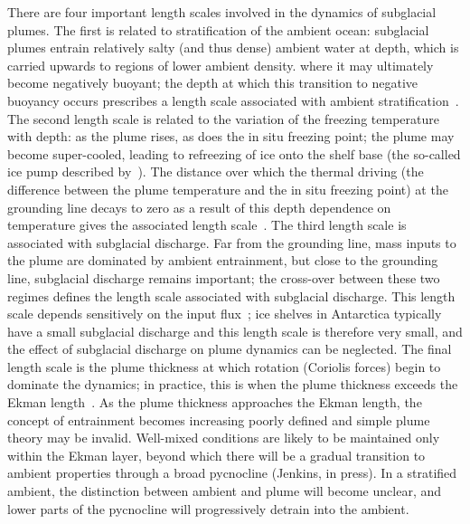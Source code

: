 \documentclass[openacc]{rsproca_new}%
\begin{document}
There are four important length scales involved in the dynamics of subglacial plumes. The first is related to stratification of the ambient ocean: subglacial plumes entrain relatively salty (and thus dense) ambient water at depth, which is carried upwards to regions of lower ambient density.  where it may ultimately become negatively buoyant; the depth at which this transition to negative buoyancy occurs prescribes a length scale associated with ambient stratification~\citep{Magorrian2016JGeoResOcean}. The second length scale is related to the variation of the freezing temperature with depth: as the plume rises, as does the in situ freezing point; the plume may become super-cooled, leading to refreezing of ice onto the shelf base (the so-called ice pump described by~\cite{Lewis1986JGeophysResOceans}). The distance over which the thermal driving (the difference between the plume temperature and the in situ freezing point) at the grounding line decays to zero as a result of this depth dependence on temperature gives the associated length scale~\citep{LaneSerff1995JGeophysResOceans}. The third length scale is associated with subglacial discharge. Far from the grounding line, mass inputs to the plume are dominated by ambient entrainment, but close to the grounding line, subglacial discharge remains important; the cross-over between these two regimes defines the length scale associated with subglacial discharge. This length scale depends sensitively on the input flux~\citep{Jenkins2011JPhysOcean}; ice shelves in Antarctica typically have a small subglacial discharge and this length scale is therefore very small, and the effect of subglacial discharge on plume dynamics can be neglected. The final length scale is the plume thickness at which rotation (Coriolis forces) begin to dominate the dynamics; in practice, this is when the plume thickness exceeds the Ekman length~\citep{Jenkins2011JPhysOcean}. As the plume thickness approaches the Ekman length, the concept of entrainment becomes increasing poorly defined and simple plume theory may be invalid.  Well-mixed conditions are likely to be maintained only within the Ekman layer, beyond which there will be a gradual transition to ambient properties through a broad pycnocline (Jenkins, in press).  In a stratified ambient, the distinction between ambient and plume will become unclear, and lower parts of the pycnocline will progressively detrain into the ambient.
\end{document}
